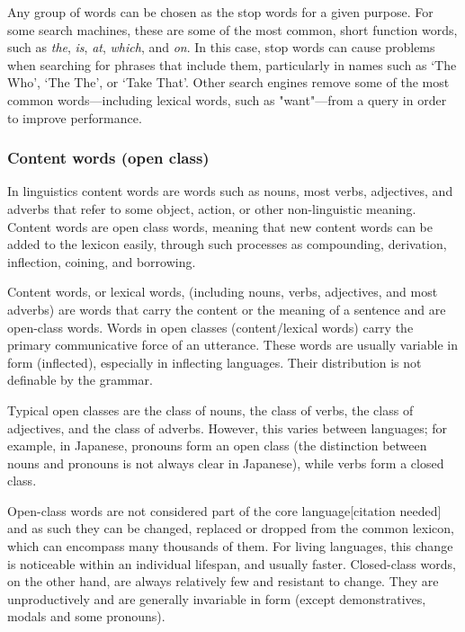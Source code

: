       Any group of words can be chosen as the stop words for a given purpose. For some search machines, these are some of the most common, short function words, such as \emph{the}, \emph{is}, \emph{at}, \emph{which}, and \emph{on}. In this case, stop words can cause problems when searching for phrases that include them, particularly in names such as `The Who', `The The', or `Take That'. Other search engines remove some of the most common words—including lexical words, such as "want"—from a query in order to improve performance.

    \subsubsection{Content words (open class)}

      In linguistics content words are words such as nouns, most verbs, adjectives, and adverbs that refer to some object, action, or other non-linguistic meaning. Content words are open class words, meaning that new content words can be added to the lexicon easily, through such processes as compounding, derivation, inflection, coining, and borrowing.
        
      Content words, or lexical words, (including nouns, verbs, adjectives, and most adverbs) are words that carry the content or the meaning of a sentence and are open-class words. Words in open classes (content/lexical words) carry the primary communicative force of an utterance. These words are usually variable in form (inflected), especially in inflecting languages. Their distribution is not definable by the grammar.

      Typical open classes are the class of nouns, the class of verbs, the class of adjectives, and the class of adverbs. However, this varies between languages; for example, in Japanese, pronouns form an open class (the distinction between nouns and pronouns is not always clear in Japanese), while verbs form a closed class.

      Open-class words are not considered part of the core language[citation needed] and as such they can be changed, replaced or dropped from the common lexicon, which can encompass many thousands of them. For living languages, this change is noticeable within an individual lifespan, and usually faster. Closed-class words, on the other hand, are always relatively few and resistant to change. They are unproductively and are generally invariable in form (except demonstratives, modals and some pronouns).
  
